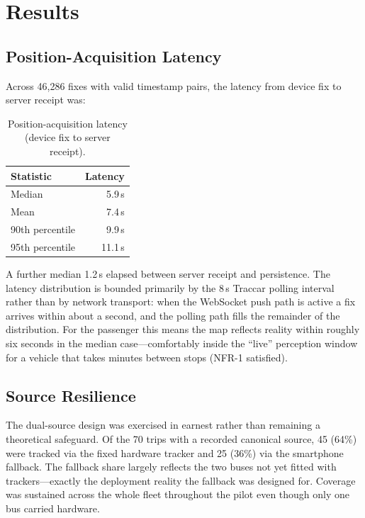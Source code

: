 \section{Results}

\subsection{Position-Acquisition Latency}
\label{sec:eval-latency}
Across 46{,}286 fixes with valid timestamp pairs, the latency from
device fix to server receipt was:

\begin{table}[H]
\caption{Position-acquisition latency (device fix to server receipt).}
\label{tab:latency}
\centering
\begin{tabular}{@{}lr@{}}
\toprule
\textbf{Statistic} & \textbf{Latency} \\
\midrule
Median            & 5.9\,s \\
Mean              & 7.4\,s \\
90th percentile   & 9.9\,s \\
95th percentile   & 11.1\,s \\
\bottomrule
\end{tabular}
\end{table}

A further median 1.2\,s elapsed between server receipt and persistence.
The latency distribution is bounded primarily by the 8\,s Traccar
polling interval rather than by network transport: when the WebSocket
push path is active a fix arrives within about a second, and the polling
path fills the remainder of the distribution. For the passenger this
means the map reflects reality within roughly six seconds in the median
case---comfortably inside the ``live'' perception window for a vehicle
that takes minutes between stops (NFR-1 satisfied).

\subsection{Source Resilience}
\label{sec:eval-sources}
The dual-source design was exercised in earnest rather than remaining a
theoretical safeguard. Of the 70 trips with a recorded canonical source,
45 (64\%) were tracked via the fixed hardware tracker and 25 (36\%) via
the smartphone fallback. The fallback share largely reflects the two
buses not yet fitted with trackers---exactly the deployment reality the
fallback was designed for. Coverage was sustained across the whole
fleet throughout the pilot even though only one bus carried hardware.

